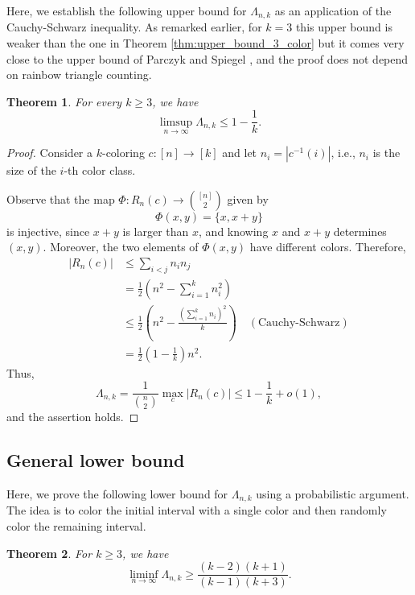 \documentclass[11pt]{article}
\theoremstyle{plain}
\newtheorem{theorem}{Theorem}[section]
\numberwithin{equation}{section}
\begin{document}
Here, we establish the following upper bound for $\Lambda_{n,k}$ as an application of the Cauchy-Schwarz inequality. As remarked earlier, for $k=3$ this upper bound is weaker than the one in Theorem \ref{thm:upper_bound_3_color} but it comes very close to the upper bound of Parczyk and Spiegel \cite{Parczyk_Spiegel_2026}, and the proof does not depend on rainbow triangle counting.

\begin{theorem} \label{thm:general_upper_bound}
For every $k\ge 3$, we have 
\[ \limsup_{n\to \infty} \Lambda_{n,k}\le 1-\frac{1}{k}.\]
\end{theorem}

\begin{proof}
Consider a $k$-coloring $c:[n]\to [k]$ and let $n_i = |c^{-1}(i)|$, i.e., $n_i$ is the size of the $i$-th color class. 

Observe that the map $\displaystyle \Phi:R_n(c)\to {[n]\choose 2}$ given by 
\[ \Phi(x,y) = \{x,x+y\}\]
is injective, since $x+y$ is larger than $x$, and knowing $x$ and $x+y$ determines $(x,y)$. Moreover, the two elements of $\Phi(x,y)$ have different colors. Therefore, 
\begin{align*}
    |R_n(c)|& \le \sum_{i<j}n_in_j\\
    & = \frac{1}{2}\left(n^2 - \sum_{i=1}^k n_i^2\right)\\
    & \le \frac{1}{2}\left(n^2-\frac{\left(\sum_{i=1}^k n_i\right)^2}{k}\right)\quad (\text{Cauchy-Schwarz})\\
    & = \frac{1}{2}\left(1-\frac{1}{k}\right)n^2. 
\end{align*}
Thus,
\[ \Lambda_{n,k} = \frac{1}{{n\choose 2}}\max_c |R_n(c)|\le 1-\frac{1}{k} + o(1),\]
and the assertion holds. 
\end{proof}

\subsection{General lower bound}

Here, we prove the following lower bound for $\Lambda_{n,k}$ using a probabilistic argument. The idea is to color the initial interval with a single color and then randomly color the remaining interval.

\begin{theorem}\label{thm:general_lower_bound} For $k\ge 3$, we have 
\[ \liminf_{n\to \infty} \Lambda_{n,k} \ge  \frac{(k-2)(k+1)}{(k-1)(k+3)}.\]
\end{theorem}
\end{document}
